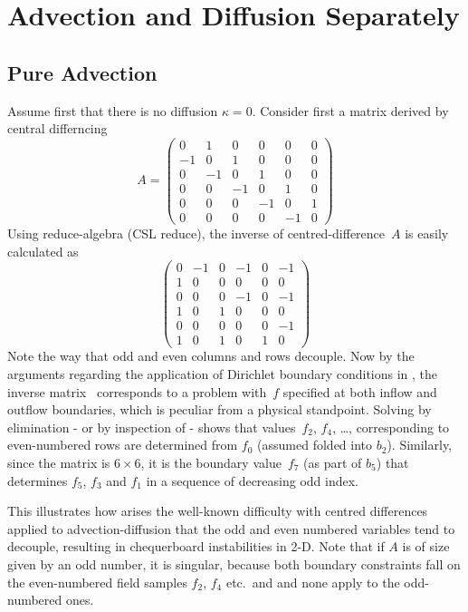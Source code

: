 \section{Advection and Diffusion Separately}\label{sec:work}
\subsection{Pure Advection}\label{sec:puread}
Assume first that there is no diffusion $\kappa=0$.
Consider first a matrix derived by central differncing
\begin{equation}\label{eq:mat1}
A=\begin{pmatrix}
0 & 1 & 0 & 0 & 0 & 0\\
-1 & 0 & 1 & 0 & 0 & 0\\
0 & -1 & 0 & 1 & 0 & 0 \\
0 & 0 & -1 & 0 & 1 & 0\\
0 & 0 & 0 & -1 & 0 & 1\\
0 & 0 & 0 & 0 & -1 & 0
\end{pmatrix}
\end{equation}
Using reduce-algebra (CSL reduce), the inverse of centred-difference~$A$ is easily calculated as
\begin{equation}\label{eq:mat2}
\begin{pmatrix}
0 & -1 & 0 & -1 & 0 & -1\\
1 & 0 & 0 & 0 & 0 & 0\\
0 & 0 & 0 & -1 & 0 & -1 \\
1 & 0 & 1 & 0 & 0 & 0\\
0 & 0 & 0 & 0 & 0 & -1\\
1 & 0 & 1 & 0 & 1 & 0
\end{pmatrix}
\end{equation}
Note the way that odd and even columns and rows decouple.
Now by the arguments regarding
the application of Dirichlet boundary conditions in ,
the inverse matrix~ corresponds to a problem   with~$f$ specified
at both inflow and outflow boundaries, which is peculiar from a physical standpoint.
Solving  by elimination - or by inspection of  - shows that
values~$f_2$, $f_4$, \ldots, corresponding to even-numbered rows are determined
from $f_0$ (assumed folded into $b_2$).
Similarly, since the matrix is $6\times6$, it is the boundary value~$f_7$ (as part of $b_5$)
that determines $f_5$, $f_3$ and $f_1$ in a sequence of decreasing odd index.

This illustrates how arises the well-known difficulty with centred differences
applied to advection-diffusion that the odd and even numbered variables tend to 
decouple, resulting in chequerboard instabilities in 2-D. Note that if $A$ is of
size given by an odd number, it is singular, because both boundary constraints
fall on the even-numbered field samples $f_2$, $f_4$ etc.\ and and none apply
to the odd-numbered ones.

